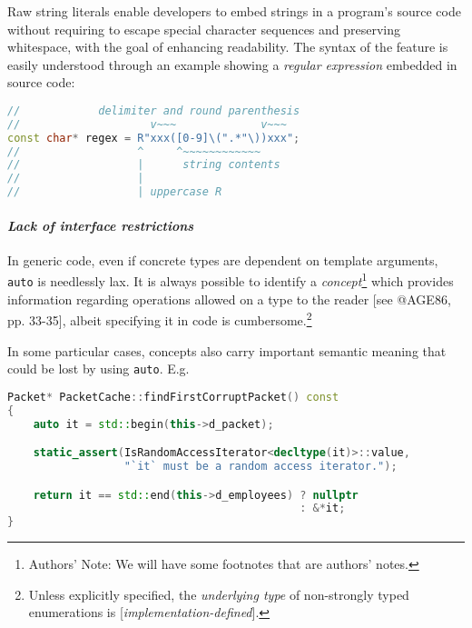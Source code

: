 \documentclass[twoside,10pt,letterpaper,usenames]{newstyle-PearsonGeneric-7-38}
\newcommand{\passthrough}[1]{\lstset{mathescape=false}#1\lstset{mathescape=true}}
\begin{document}
Raw string literals enable developers to embed strings in a program's
source code without requiring to escape special character sequences and
preserving whitespace, with the goal of enhancing readability. The
syntax of the feature is easily understood through an example showing a
\emph{regular expression} embedded in source code:

\begin{lstlisting}[language=C++, caption={ missing caption }, label={ testlabel }, frame=tb]
//            delimiter and round parenthesis
//                    v~~~             v~~~
const char* regex = R"xxx([0-9]\(".*"\))xxx";
//                  ^     ^~~~~~~~~~~~~
//                  |      string contents
//                  |
//                  | uppercase R
\end{lstlisting}
    

\hypertarget{lack-of-interface-restrictions}{%
\paragraph{\texorpdfstring{\emph{Lack of interface
restrictions}}{Lack of interface restrictions}}\label{lack-of-interface-restrictions}}

In generic code, even if concrete types are dependent on template
arguments, \passthrough{\lstinline!auto!} is needlessly lax. It is
always possible to identify a \emph{concept}\footnote{Authors' Note: We
  will have some footnotes that are authors' notes.} which provides
information regarding operations allowed on a type to the reader {[}see
@AGE86, pp. 33-35{]}, albeit specifying it in code is
cumbersome.\footnote{Unless explicitly specified, the \emph{underlying
  type} of non-strongly typed enumerations is
  {[}\emph{implementation-defined}{]}.}

In some particular cases, concepts also carry important semantic meaning
that could be lost by using \passthrough{\lstinline!auto!}. E.g.

\begin{lstlisting}[language=C++, caption={ missing caption }, label={ testlabel }, frame=tb]
Packet* PacketCache::findFirstCorruptPacket() const
{
    auto it = std::begin(this->d_packet);

    static_assert(IsRandomAccessIterator<decltype(it)>::value,
                  "`it` must be a random access iterator.");

    return it == std::end(this->d_employees) ? nullptr
                                             : &*it;
}
\end{lstlisting}
    
\end{document}
